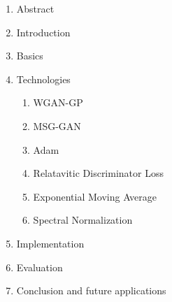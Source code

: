 \documentclass[conference,onecolumn,compsoc]{IEEEtran}
\begin{document}
\noindent
\begin{enumerate}
  \item Abstract
  \item Introduction
  \item Basics \cite{goodfellow2014generative}
  \item Technologies
  \begin{enumerate}
    \item WGAN-GP \cite{arjovsky2017wasserstein,gulrajani2017improved}
    \item MSG-GAN \cite{karnewar2020msggan}
    \item Adam \cite{kingma2017adam}
    \item Relatavitic Discriminator Loss \cite{jolicoeurmartineau2018relativistic}
    \item Exponential Moving Average \cite{yazıcı2019unusual}
    \item Spectral Normalization \cite{miyato2018spectral}
  \end{enumerate}
  \item Implementation
  \item Evaluation
  \item Conclusion and future applications
\end{enumerate}


\newpage


\printbibliography
\end{document}
